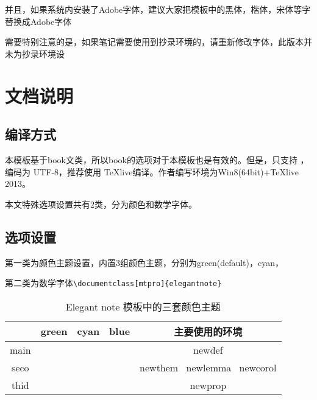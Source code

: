 \documentclass[cyan]{elegantnote}
\begin{document}
并且，如果系统内安装了Adobe字体，建议大家把模板中的黑体，楷体，宋体等字替换成Adobe字体

\begin{note}
需要特别注意的是，如果笔记需要使用到抄录环境的，请重新修改字体，此版本并未为抄录环境设
\end{note}

\section{文档说明}
\subsection{编译方式}
本模板基于book文类，所以book的选项对于本模板也是有效的。但是，只支持 \XeLaTeX{}，编码为 UTF-8，推荐使用 \TeX{}live编译。作者编写环境为Win8(64bit)+\TeX{}live 2013。

本文特殊选项设置共有2类，分为{\color{main}颜色}和{\color{main}数学字体}。

\subsection{选项设置}
第一类为{\color{main}颜色}主题设置，内置3组颜色主题，分别为green(default)，cyan，

第二类为{\color{main}数学字体}\verb|\documentclass[mtpro]{elegantnote}|

\begin{table}[htp]
\centering
\begin{tabular}{ccccc}
\toprule	
	   & green & cyan & blue & 主要使用的环境\\ 
\midrule
main & \makecell{{\color{main1}\rule{1cm}{1cm}}}& \makecell{{\color{main2}\rule{1cm}{1cm}}}&\makecell{ {\color{main3}\rule{1cm}{1cm}}}& newdef\\

seco &\makecell{ {\color{seco1}\rule{1cm}{1cm}}}& \makecell{{\color{seco2}\rule{1cm}{1cm}}}&\makecell{ {\color{seco3}\rule{1cm}{1cm}}}&newthem \ newlemma \ newcorol\\

thid &\makecell{ {\color{thid1}\rule{1cm}{1cm}}}& \makecell{{\color{thid2}\rule{1cm}{1cm}}}&\makecell{ {\color{thid3}\rule{1cm}{1cm}}}&newprop\\
\bottomrule
\end{tabular}
\caption{Elegant note 模板中的三套颜色主题\label{tab:color thm}}
\end{table}
\end{document}

